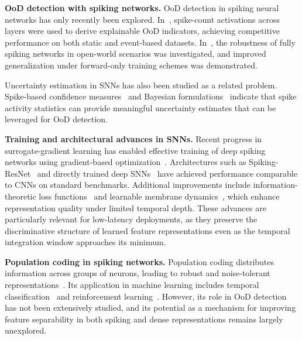 \documentclass{ieeeaccess}
\begin{document}
\vspace{0.3em}
\noindent\textbf{OoD detection with spiking networks.}
OoD detection in spiking neural networks has only recently been explored. In~\cite{2023-martinez}, spike-count activations across layers were used to derive explainable OoD indicators, achieving competitive performance on both static and event-based datasets. In~\cite{terresescudero2025}, the robustness of fully spiking networks in open-world scenarios was investigated, and improved generalization under forward-only training schemes was demonstrated.

Uncertainty estimation in SNNs has also been studied as a related problem. Spike-based confidence measures~\cite{Sun_2023} and Bayesian formulations~\cite{prabodh2024} indicate that spike activity statistics can provide meaningful uncertainty estimates that can be leveraged for OoD detection.


\vspace{0.3em}
\noindent\textbf{Training and architectural advances in SNNs.}
Recent progress in surrogate-gradient learning has enabled effective training of deep spiking networks using gradient-based optimization~\cite{neftci2019surrogate, zenke2021remarkable, eshraghian2023training}. Architectures such as Spiking-ResNet~\cite{2022-fang, 2021-zheng} and directly trained deep SNNs~\cite{2020-rathi} have achieved performance comparable to CNNs on standard benchmarks. Additional improvements include information-theoretic loss functions~\cite{2022-Guo} and learnable membrane dynamics~\cite{2025-shen}, which enhance representation quality under limited temporal depth. These advances are particularly relevant for low-latency deployments, as they preserve the discriminative structure of learned feature representations even as the temporal integration window approaches its minimum.

\vspace{0.3em}
\noindent\textbf{Population coding in spiking networks.}  
Population coding distributes information across groups of neurons, leading to robust and noise-tolerant representations~\cite{Tkacik2010Optimal, Tripp2012Population}. Its application in machine learning includes temporal classification~\cite{Pan2019NeuralPopulation} and reinforcement learning~\cite{Zhang2021PopulationCoding}. However, its role in OoD detection has not been extensively studied, and its potential as a mechanism for improving feature separability in both spiking and dense representations remains largely unexplored.
\end{document}
